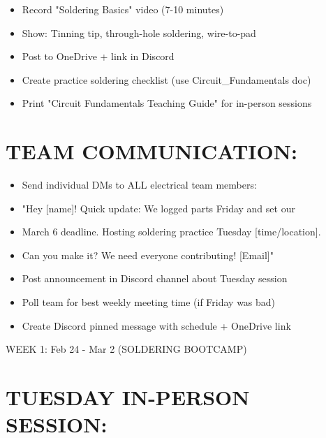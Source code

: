 \documentclass[11pt,letterpaper]{article}
\begin{document}
\begin{itemize}
  \item [WARNING]  [ ] Record "Soldering Basics" video (7-10 minutes)
  \item Show: Tinning tip, through-hole soldering, wire-to-pad
  \item Post to OneDrive + link in Discord
\end{itemize}

\begin{itemize}
  \item  [ ] Create practice soldering checklist (use Circuit\_Fundamentals doc)
  \item  [ ] Print "Circuit Fundamentals Teaching Guide" for in-person sessions
\end{itemize}

\section{TEAM COMMUNICATION:}

\begin{itemize}
  \item [WARNING]  [ ] Send individual DMs to ALL electrical team members:
  \item "Hey [name]! Quick update: We logged parts Friday and set our
  \item March 6 deadline. Hosting soldering practice Tuesday [time/location].
  \item Can you make it? We need everyone contributing! [Email]"
\end{itemize}

\begin{itemize}
  \item [WARNING]  [ ] Post announcement in Discord channel about Tuesday session
  \item [WARNING]  [ ] Poll team for best weekly meeting time (if Friday was bad)
\end{itemize}

\begin{itemize}
  \item  [ ] Create Discord pinned message with schedule + OneDrive link
\end{itemize}

WEEK 1: Feb 24 - Mar 2 (SOLDERING BOOTCAMP)\par

\section{TUESDAY IN-PERSON SESSION:}
\end{document}
